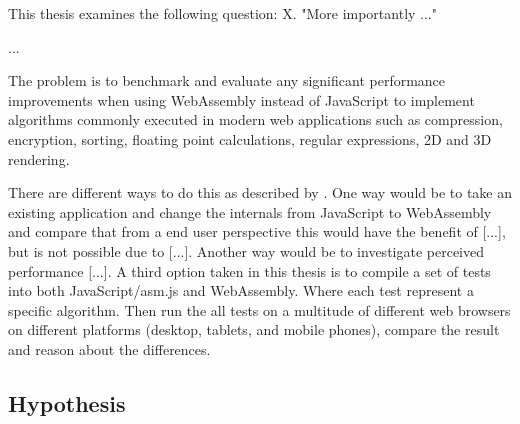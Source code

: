 This thesis examines the following question: X. "More importantly ..."

...





The problem is to benchmark and evaluate any significant performance improvements \parencite{HaasRossbergSchuffTitzerHolmanGohmanWagnerZakaiBastien2017,ReiserBlaser2017,Zakai2018} when using WebAssembly instead of JavaScript to implement algorithms commonly executed in modern web applications such as compression, encryption, sorting, floating point calculations, regular expressions, 2D and 3D rendering.

There are different ways to do this as described by \textcite{WohlinRunesonHostOhlssonRegnellWesslen2012}. One way would be to take an existing application and change the internals from JavaScript to WebAssembly and compare that from a end user perspective this would have the benefit of [...], but is not possible due to [...]. Another way would be to investigate perceived performance [...]. A third option taken in this thesis is to compile a set of tests into both JavaScript/asm.js and WebAssembly. Where each test represent a specific algorithm. Then run the all tests on a multitude of different web browsers on different platforms (desktop, tablets, and mobile phones), compare the result and reason about the differences.





\subsection{Hypothesis}

